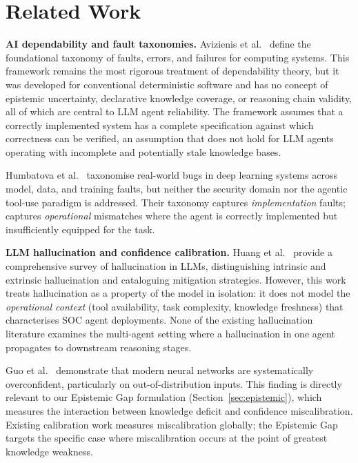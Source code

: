 \section{Related Work}
\label{sec:related}

\textbf{AI dependability and fault taxonomies.}
Avizienis et al.~\cite{avizienis2004} define the foundational taxonomy of
faults, errors, and failures for computing systems. This framework remains
the most rigorous treatment of dependability theory, but it was developed
for conventional deterministic software and has no concept of epistemic
uncertainty, declarative knowledge coverage, or reasoning chain validity, all of which are
central to LLM agent reliability. The framework assumes that a correctly
implemented system has a complete specification against which correctness
can be verified, an assumption that does not hold for LLM agents operating
with incomplete and potentially stale knowledge bases.

Humbatova et al.~\cite{humbatova2020} taxonomise real-world bugs in deep
learning systems across model, data, and training faults, but neither the
security domain nor the agentic tool-use paradigm is addressed. Their
taxonomy captures \textit{implementation} faults; \ARES{} captures
\textit{operational} mismatches where the agent is correctly implemented
but insufficiently equipped for the task.

\textbf{LLM hallucination and confidence calibration.}
Huang et al.~\cite{huang2023hallucination} provide a comprehensive survey
of hallucination in LLMs, distinguishing intrinsic and extrinsic
hallucination and cataloguing mitigation strategies. However, this work
treats hallucination as a property of the model in isolation: it does not
model the \textit{operational context} (tool availability, task complexity,
knowledge freshness) that characterises SOC agent deployments. None of
the existing hallucination literature examines the multi-agent
setting where a hallucination in one agent propagates to downstream
reasoning stages.

Guo et al.~\cite{guo2017calibration} demonstrate that modern neural
networks are systematically overconfident, particularly on out-of-distribution
inputs. This finding is directly relevant to our Epistemic Gap formulation
(Section~\ref{sec:epistemic}), which measures the interaction between
knowledge deficit and confidence miscalibration. Existing calibration work
measures miscalibration globally; the Epistemic Gap targets the specific
case where miscalibration occurs at the point of greatest knowledge weakness.


